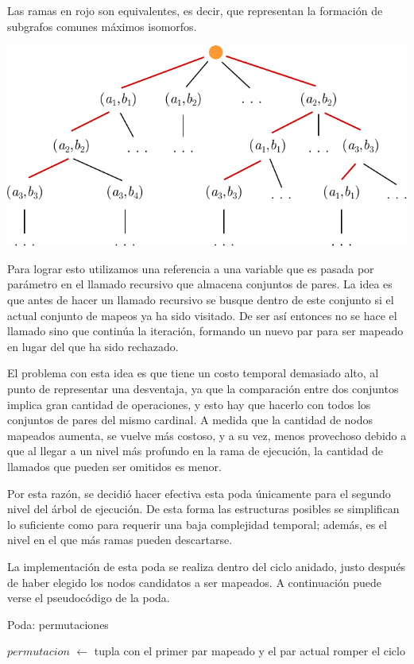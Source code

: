 Las ramas en rojo son equivalentes, es decir, que representan la formación de
subgrafos comunes máximos isomorfos.

\begin{center}
\includegraphics[width=.7\textwidth]{imagenes/ex2_execution_tree.pdf}
\end{center}

Para lograr esto utilizamos una referencia a una variable que es pasada por
parámetro en el llamado recursivo que almacena conjuntos de pares. La idea es
que antes de hacer un llamado recursivo se busque dentro de este conjunto
si el actual conjunto de mapeos ya ha sido visitado. De ser así entonces no se
hace el llamado sino que continúa la iteración, formando un nuevo par para ser
mapeado en lugar del que ha sido rechazado.

El problema con esta idea es que tiene un costo temporal demasiado alto, al
punto de representar una desventaja, ya que la comparación entre dos conjuntos
implica gran cantidad de operaciones, y esto hay que hacerlo con todos los
conjuntos de pares del mismo cardinal. A medida que la cantidad de nodos
mapeados aumenta, se vuelve más costoso, y a su vez, menos provechoso debido
a que al llegar a un nivel más profundo en la rama de ejecución, la cantidad
de llamados que pueden ser omitidos es menor.

Por esta razón, se decidió hacer efectiva esta poda únicamente para el segundo
nivel del árbol de ejecución. De esta forma las estructuras posibles se
simplifican lo suficiente como para requerir una baja complejidad temporal;
además, es el nivel en el que más ramas pueden descartarse.

La implementación de esta poda se realiza dentro del ciclo anidado, justo
después de haber elegido los nodos candidatos a ser mapeados. A continuación
puede verse el pseudocódigo de la poda.

\begin{algorithm}
    \SetAlgoVlined
    \caption{Poda: permutaciones}
     {
        $permutacion$ $\gets$ tupla con el primer par mapeado y el par actual \;
         {
            romper el ciclo \;
        }
    }
\end{algorithm}


